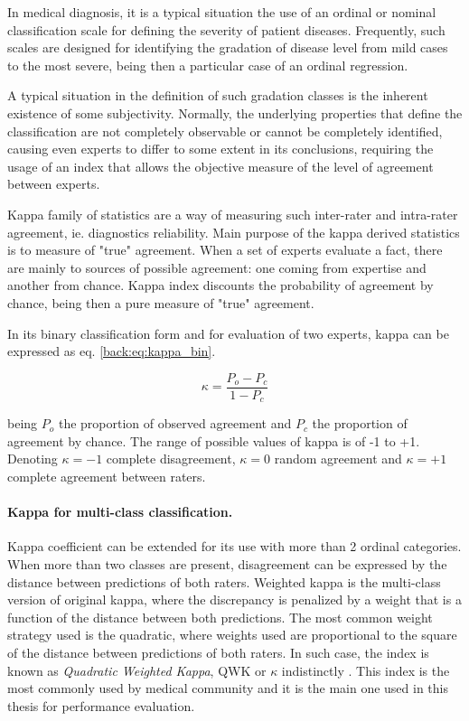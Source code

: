 In medical diagnosis, it is a typical situation the use of an ordinal or nominal classification scale for defining the severity of patient diseases. Frequently, such scales are designed for identifying the gradation of disease level from mild cases to the most severe, being then a particular case of an ordinal regression.

A typical situation in the definition of such gradation classes is the inherent existence of some subjectivity. Normally, the underlying properties that define the classification are not completely observable or cannot be completely identified, causing even experts to differ to some extent in its conclusions, requiring the usage of an index that allows the objective measure of the level of agreement between experts.

Kappa family of statistics \citep{sim2005kappa} are a way of measuring such inter-rater and intra-rater agreement, ie. diagnostics reliability. Main purpose of the kappa derived statistics is to measure of "true" agreement. When a set of experts evaluate a fact, there are mainly to sources of possible agreement: one coming from expertise and another from chance. Kappa index discounts the probability of agreement by chance, being then a pure measure of "true" agreement.

In its binary classification form and for evaluation of two experts, kappa can be expressed as eq. \ref{back:eq:kappa_bin}.

\begin{equation}
\kappa = \frac{P_o - P_c}{1 - P_c}
\label{back:eq:kappa_bin}
\end{equation}

being $P_o$ the proportion of observed agreement and $P_c$ the proportion of agreement by chance. The range of possible values of kappa is of -1 to +1. Denoting $\kappa=-1$ complete disagreement, $\kappa=0$ random agreement and $\kappa=+1$ complete agreement between raters.

\paragraph{Kappa for multi-class classification.} Kappa coefficient can be extended for its use with more than 2 ordinal categories. When more than two classes are present, disagreement can be expressed by the distance between predictions of both raters. Weighted kappa is the multi-class version of original kappa, where the discrepancy is penalized by a weight that is a function of the distance between both predictions. The most common weight strategy used is the quadratic, where weights used are proportional to the square of the distance between predictions of both raters. In such case, the index is known as \emph{Quadratic Weighted Kappa}, QWK or $\kappa$ indistinctly \citep{cohen1968weighted}. This index is the most commonly used by medical community and it is the main one used in this thesis for performance evaluation.

